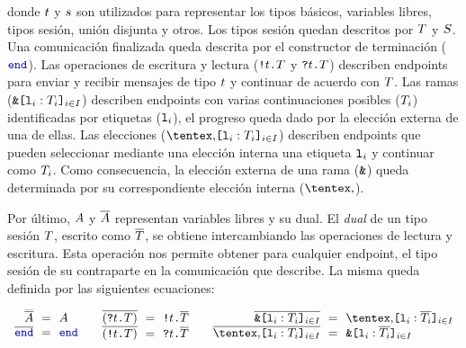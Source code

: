 donde $t$ y $s$ son utilizados para representar los tipos básicos,
variables libres, tipos sesión, unión disjunta y otros. Los tipos sesión quedan
descritos por $T$ y $S$. Una comunicación finalizada
queda descrita por el constructor de terminación ($\End$). Las operaciones de
escritura y lectura (${\texttt{\upshape!}}{t}\texttt{\upshape.}T$ y ${\texttt{\upshape?}}{t}\texttt{\upshape.}T$) describen
endpoints para enviar y recibir mensajes de tipo $t$ y continuar de acuerdo
con $T$. Las ramas ($\Branch \set[i\in I]{\Tag_i : \SessionType_i}$)
describen endpoints con varias continuaciones posibles ($T_i$)
identificadas por etiquetas ($\mathtt{l}_i$), el progreso queda dado por la elección
externa de una de ellas. Las elecciones ($\Choice \set[i\in I]{\Tag_i :
\SessionType_i}$) describen endpoints que pueden seleccionar mediante una
elección interna una etiqueta $\mathtt{l}_i$ y continuar como $T_i$. Como
consecuencia, la elección externa de una rama ($\texttt{\upshape\&}$) queda determinada por
su correspondiente elección interna ($\Choice$).

Por último, $A$ y $\overline{A}$ representan variables libres y su dual. El
\emph{dual} de un tipo sesión $T$, escrito como $\overline{T}$,
se obtiene intercambiando las operaciones de lectura y escritura. Esta operación
nos permite obtener para cualquier endpoint, el tipo sesión de su contraparte en
la comunicación que describe. La misma queda definida por las siguientes
ecuaciones:

\[
\begin{array}{c}
  \begin{array}{@{}r@{~~}c@{~~}l@{}}
    \smash{\dual{\dual\etvar}} & = & \etvar \\
    \dual\End & = & \End \\
  \end{array}
  \qquad
  \begin{array}{@{}r@{~~}c@{~~}l@{}}
    \dual{(\In\Type\SessionType)} & = & \Out\Type\dual\SessionType \\
    \dual{(\Out\Type\SessionType)} & = & \In\Type\dual\SessionType \\
  \end{array}
  \qquad
  \begin{array}{@{}r@{~~}c@{~~}l@{}}
    \dual{\Branch \set[i\in I]{\Tag_i : \SessionType_i}}
    & = & \Choice \set[i\in I]{\Tag_i : \dual{\SessionType_i}} \\
    \dual{\Choice \set[i\in I]{\Tag_i : \SessionType_i}}
    & = & \Branch \set[i\in I]{\Tag_i : \dual{\SessionType_i}} \\
  \end{array}
\end{array}
\]

